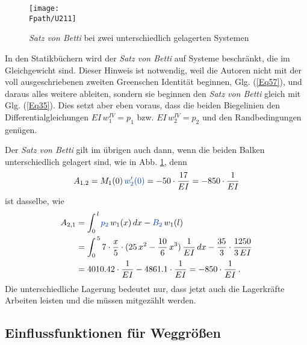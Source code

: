 \begin{figure}[tbp]
\centering
\if {} \sidecaption \fi
\texttt{[image: \\Fpath/U211]}
\caption{{\em Satz von Betti\/} bei zwei unterschiedlich gelagerten Systemen} \label{U211}
%
\end{figure}%

In den Statikb\"{u}chern wird der {\em Satz von Betti\/} auf Systeme beschr\"{a}nkt, die im Gleichgewicht sind. Dieser Hinweis ist notwendig, weil die Autoren nicht mit der voll ausgeschriebenen zweiten Greenschen Identit\"{a}t beginnen, Glg. (\ref{Eq57}), und daraus alles weitere ableiten, sondern sie  beginnen den {\em Satz von Betti\/} gleich mit Glg. (\ref{Eq35}). Dies setzt aber eben voraus, dass die beiden Biegelinien den Differentialgleichungen $EI\,w_1^{IV} = p_1$ bzw. $EI\,w_2^{IV} = p_2$ und den Randbedingungen gen\"{u}gen.

Der {\em Satz von Betti\/} gilt im \"{u}brigen auch dann, wenn die beiden Balken unterschiedlich gelagert sind, wie in Abb. \ref{U211}, denn
\begin{align}
A_{1,2} = M_1(0)\,\textcolor{chapterTitleBlue}{w_2'(0)} = - 50 \cdot \frac{17}{EI}= - 850\cdot\frac{1}{EI}
\end{align}
ist dasselbe, wie
\begin{align}
A_{2,1} &=   \int_0^{\,l} \textcolor{chapterTitleBlue}{p_2}\,w_1(x)\,dx - \textcolor{chapterTitleBlue}{B_2}\,w_1(l)\nn \\
&= \int_0^{\,5} 7 \cdot \frac{x}{5} \cdot ( 25\,x^2 - \frac{10}{6}\,x^3)\,\frac{1}{EI}\,dx  - \frac{35}{3} \cdot \frac{1250}{3\,EI}\nn \\
&=  4010.42  \cdot\frac{1}{EI} - 4861.1\cdot\frac{1}{EI} = - 850\cdot\frac{1}{EI}\,.
\end{align}
Die unterschiedliche Lagerung bedeutet nur, dass jetzt auch die Lagerkr\"{a}fte Arbeiten leisten und die m\"{u}ssen mitgez\"{a}hlt werden.

{\textcolor{sectionTitleBlue}{\section{Einflussfunktionen f\"{u}r Weggr\"{o}{\ss}en}}}

